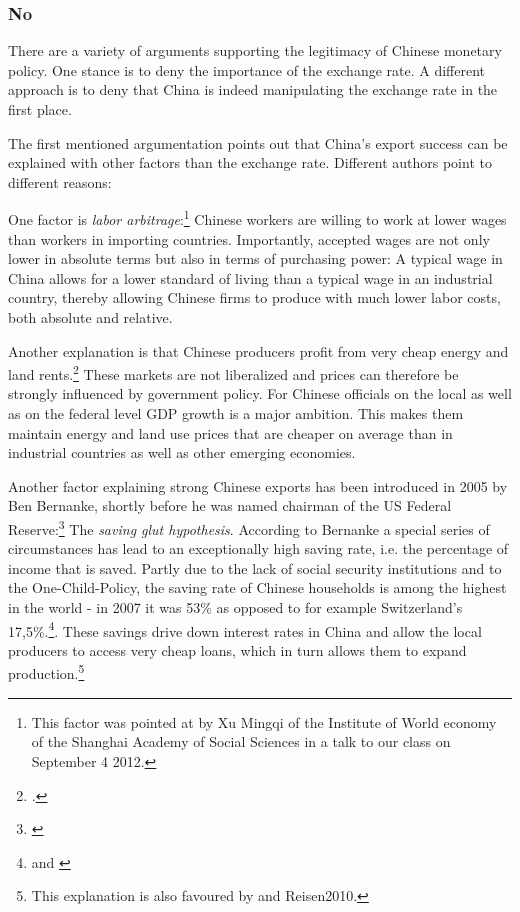 \subsubsection{No}

There are a variety of arguments supporting the legitimacy of Chinese 
monetary policy.  One stance is to deny the importance of the exchange 
rate. A different approach is to deny that China is indeed manipulating 
the exchange rate in the first place.

The first mentioned argumentation points out that China's export success 
can be explained with other factors than the exchange rate.  Different 
authors point to different reasons: 

One factor is \emph{labor arbitrage}:\footnote{This factor was pointed at 
by Xu Mingqi of the Institute of World economy of the Shanghai Academy 
of Social Sciences in a talk to our class on September 4 2012.} Chinese 
workers are willing to work at lower wages than workers in importing 
countries. Importantly, accepted wages are not only lower in absolute 
terms but also in terms of purchasing power: A typical wage in China 
allows for a lower standard of living than a typical wage in an 
industrial country, thereby allowing Chinese firms to produce with much 
lower labor costs, both absolute and relative. 

Another explanation is that Chinese producers profit from very cheap energy and land 
rents.\footnote{\cite[pp.  25]{Huang2010}.} These markets are not 
liberalized and prices can therefore be strongly influenced by 
government policy. For Chinese officials on the local as well as on the 
federal level GDP growth is a major ambition. This makes them maintain 
energy and land use prices that are cheaper on average than in 
industrial countries as well as other emerging economies.

Another factor explaining strong Chinese exports has been introduced 
in 2005 by Ben Bernanke, shortly before he was named chairman of the US 
Federal Reserve:\footnote{\cite{Bernanke2005}} The \emph{saving glut 
hypothesis}. According to Bernanke a special series of circumstances has 
lead to an exceptionally high saving rate, i.e. the percentage of income 
that is saved. Partly due to the lack of social security institutions 
and to the One-Child-Policy, the saving rate of Chinese households is 
among the highest in the world - in 2007 it was 53\% as opposed to for 
example Switzerland's 17,5\%.\footnote{\cite[pp.  20]{Yang2011} and 
\cite{BFS2012}}. These savings drive down interest rates in China and 
allow the local producers to access very cheap loans, which in turn 
allows them to expand production.\footnote{This explanation is also 
favoured by \cite[pp. 41]{Wyplosz2010} and \cite{p.  65}{Reisen2010}.}

